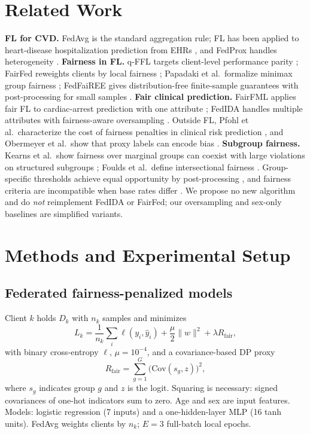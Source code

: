 \documentclass[conference]{IEEEtran}
\begin{document}
\section{Related Work}
\textbf{FL for CVD.} FedAvg \cite{mcmahan2017} is the standard aggregation rule; FL has been applied to heart-disease hospitalization prediction from EHRs \cite{brisimi2018}, and FedProx handles heterogeneity \cite{li2020fedprox}. \textbf{Fairness in FL.} q-FFL targets client-level performance parity \cite{li2020qffl}; FairFed reweights clients by local fairness \cite{ezzeldin2023}; Papadaki et al.\ formalize minimax group fairness \cite{papadaki2022}; FedFaiREE gives distribution-free finite-sample guarantees with post-processing for small samples \cite{yin2024}. \textbf{Fair clinical prediction.} FairFML applies fair FL to cardiac-arrest prediction with one attribute \cite{li2025fairfml}; FedIDA handles multiple attributes with fairness-aware oversampling \cite{wu2025fedida}. Outside FL, Pfohl et al.\ characterize the cost of fairness penalties in clinical risk prediction \cite{pfohl2019,pfohl2021}, and Obermeyer et al.\ show that proxy labels can encode bias \cite{obermeyer2019}. \textbf{Subgroup fairness.} Kearns et al.\ show fairness over marginal groups can coexist with large violations on structured subgroups \cite{kearns2018}; Foulds et al.\ define intersectional fairness \cite{foulds2020}. Group-specific thresholds achieve equal opportunity by post-processing \cite{hardt2016}, and fairness criteria are incompatible when base rates differ \cite{chouldechova2017,kleinberg2017}. We propose no new algorithm and do \emph{not} reimplement FedIDA or FairFed; our oversampling and sex-only baselines are simplified variants.

\section{Methods and Experimental Setup}
\subsection{Federated fairness-penalized models}
\label{sec:penalty}
Client $k$ holds $D_k$ with $n_k$ samples and minimizes
\begin{equation}
L_k=\frac1{n_k}\sum_{i}\ell(y_i,\hat y_i)+\frac{\mu}{2}\|w\|^2+\lambda R_{\mathrm{fair}},
\end{equation}
with binary cross-entropy $\ell$, $\mu=10^{-4}$, and a covariance-based DP proxy \cite{zafar2017}
\begin{equation}
R_{\mathrm{fair}}=\sum_{g=1}^{G}\big(\mathrm{Cov}(s_g,z)\big)^2,
\end{equation}
where $s_g$ indicates group $g$ and $z$ is the logit. Squaring is necessary: signed covariances of one-hot indicators sum to zero. Age and sex are input features. Models: logistic regression (7 inputs) and a one-hidden-layer MLP (16 tanh units). FedAvg weights clients by $n_k$; $E{=}3$ full-batch local epochs.
\end{document}
